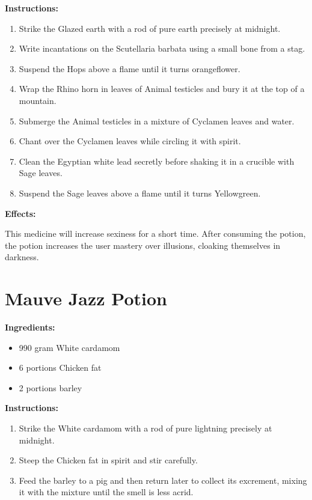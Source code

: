 \documentclass{article}
\begin{document}
\textbf{Instructions:}

\begin{enumerate}
  \item Strike the Glazed earth with a rod of pure earth precisely at midnight.
  \item Write incantations on the Scutellaria barbata using a small bone from a stag.
  \item Suspend the Hops above a flame until it turns orangeflower.
  \item Wrap the Rhino horn in leaves of Animal testicles and bury it at the top of a mountain.
  \item Submerge the Animal testicles in a mixture of Cyclamen leaves and water.
  \item Chant over the Cyclamen leaves while circling it with spirit.
  \item Clean the Egyptian white lead secretly before shaking it in a crucible with Sage leaves.
  \item Suspend the Sage leaves above a flame until it turns Yellowgreen.
\end{enumerate}

\textbf{Effects:}

This medicine will increase sexiness for a short time. After consuming the potion, the potion increases the user mastery over illusions, cloaking themselves in darkness.

\newpage
\section*{Mauve Jazz Potion}

\textbf{Ingredients:}

\begin{itemize}
  \item 990 gram White cardamom
  \item 6 portions Chicken fat
  \item 2 portions barley
\end{itemize}

\textbf{Instructions:}

\begin{enumerate}
  \item Strike the White cardamom with a rod of pure lightning precisely at midnight.
  \item Steep the Chicken fat in spirit and stir carefully.
  \item Feed the barley to a pig and then return later to collect its excrement, mixing it with the mixture until the smell is less acrid.
\end{enumerate}
\end{document}
